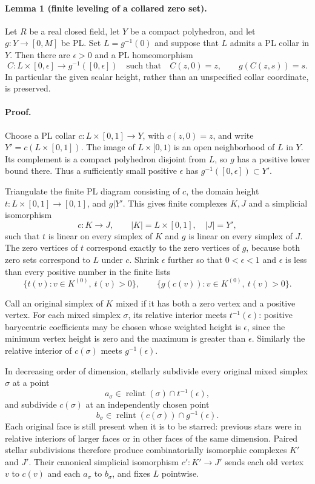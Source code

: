\paragraph{Lemma 1 (finite leveling of a collared zero set).}
Let $R$ be a real closed field, let $Y$ be a compact polyhedron, and let
$g:Y\to[0,M]$ be PL. Set $L=g^{-1}(0)$ and suppose that $L$ admits a PL collar
in $Y$. Then there are $\epsilon>0$ and a PL homeomorphism
\[
 C:L\times[0,\epsilon]\longrightarrow g^{-1}([0,\epsilon])
 \quad\text{such that}\quad
 C(z,0)=z,\qquad g(C(z,s))=s.
 \tag{SC.1}
\]
In particular the given scalar height, rather than an unspecified collar
coordinate, is preserved.

\paragraph{Proof.}
Choose a PL collar $c:L\times[0,1]\to Y$, with $c(z,0)=z$, and write
$Y'=c(L\times[0,1])$. The image of $L\times[0,1)$ is an open neighborhood
of $L$ in $Y$. Its complement is a compact polyhedron disjoint from $L$,
so $g$ has a positive lower bound there. Thus a sufficiently small positive
$\epsilon$ has $g^{-1}([0,\epsilon])\subset Y'$.

Triangulate the finite PL diagram consisting of $c$, the domain height
$t:L\times[0,1]\to[0,1]$, and $g|Y'$. This gives finite complexes $K,J$
and a simplicial isomorphism
\[
 c:K\longrightarrow J,
 \qquad |K|=L\times[0,1],\quad |J|=Y',
\]
such that $t$ is linear on every simplex of $K$ and $g$ is linear on every
simplex of $J$. The zero vertices of $t$ correspond exactly to the zero
vertices of $g$, because both zero sets correspond to $L$ under $c$.
Shrink $\epsilon$ further so that $0<\epsilon<1$ and $\epsilon$ is less
than every positive number in the finite lists
\[
 \{t(v):v\in K^{(0)},\ t(v)>0\},\qquad
 \{g(c(v)):v\in K^{(0)},\ t(v)>0\}.
 \tag{SC.2}
\]

Call an original simplex of $K$ mixed if it has both a zero vertex and a
positive vertex. For each mixed simplex $\sigma$, its relative interior
meets $t^{-1}(\epsilon)$: positive barycentric coefficients may be chosen
whose weighted height is $\epsilon$, since the minimum vertex height is
zero and the maximum is greater than $\epsilon$. Similarly the relative
interior of $c(\sigma)$ meets $g^{-1}(\epsilon)$.

In decreasing order of dimension, stellarly subdivide every original mixed
simplex $\sigma$ at a point
\[
 a_\sigma\in\operatorname{relint}(\sigma)\cap t^{-1}(\epsilon),
\]
and subdivide $c(\sigma)$ at an independently chosen point
\[
 b_\sigma\in\operatorname{relint}(c(\sigma))\cap g^{-1}(\epsilon).
\]
Each original face is still present when it is to be starred: previous stars
were in relative interiors of larger faces or in other faces of the same
dimension. Paired stellar subdivisions therefore produce combinatorially
isomorphic complexes $K'$ and $J'$. Their canonical simplicial isomorphism
$c':K'\to J'$ sends each old vertex $v$ to $c(v)$ and each $a_\sigma$ to
$b_\sigma$, and fixes $L$ pointwise.

